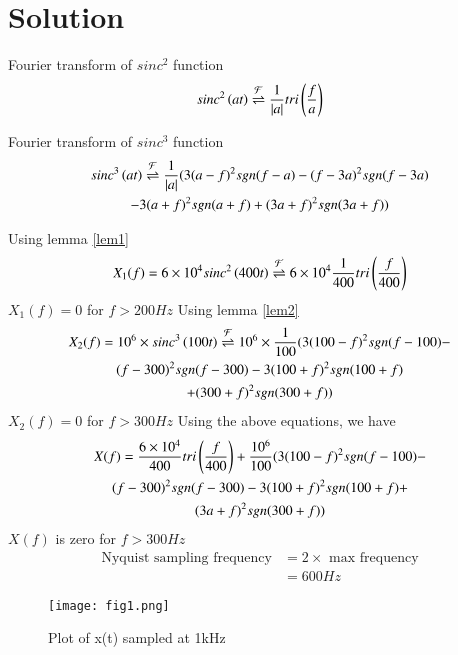 \documentclass[journal,12pt,twocolumn]{IEEEtran}
\begin{document}
\section{Solution}
\begin{lemma}
\label{lem1}
Fourier transform of $sinc^{2}$ function 
\begin{align}
     sinc^{2}\left(at\right) \overset{\mathcal{F}}{ \rightleftharpoons} \frac{1}{|a|}tri\left(\frac{f}{a}\right)\label{ft}
\end{align}
\end{lemma}
\begin{lemma}
\label{lem2}
Fourier transform of $sinc^{3}$ function 
\begin{multline}
     sinc^{3}\left(at\right) \overset{\mathcal{F}}{ \rightleftharpoons} \frac{1}{|a|} (3(a-f)^{2}sgn(f-a)-(f-3a)^{2}sgn(f-3a)\\-3(a+f)^{2}sgn(a+f)+(3a+f)^{2}sgn(3a+f))
\end{multline}
\end{lemma}
Using lemma \ref{lem1} 
\begin{align}
     X_{1}(f)=6\times 10^{4}sinc^{2}\left(400t\right) \overset{\mathcal{F}}{ \rightleftharpoons} 6\times 10^{4}\frac{1}{400}tri\left(\frac{f}{400}\right)
\end{align}
$X_{1}(f)=0$ for $f>200Hz$
Using lemma \ref{lem2}
\begin{multline}
         X_{2}(f)=10^{6}\times sinc^{3}\left(100t\right) \overset{\mathcal{F}}{ \rightleftharpoons} 10^{6}\times\frac{1}{100} (3(100-f)^{2}sgn(f-100)-\\(f-300)^{2}sgn(f-300)-3(100+f)^{2}sgn(100+f)\\+(300+f)^{2}sgn(300+f))
\end{multline}
$X_{2}(f)=0$ for $f>300Hz$
Using the above equations, we have
\begin{multline}
    X(f) = \frac{6\times 10^{4}}{400}tri\left(\frac{f}{400}\right)+ \frac{10^{6}}{100}(3(100-f)^{2}sgn(f-100)-\\(f-300)^{2}sgn(f-300)-3(100+f)^{2}sgn(100+f)+\\(3a+f)^{2}sgn(300+f))
\end{multline}
$X(f)$ is zero for $f>300Hz$
\begin{align}
    \text{Nyquist sampling frequency}&=2\times \text{ max frequency}\\
                       &=600Hz
\end{align}

\begin{figure}[!h]
 \centering
 \texttt{[image: fig1.png]}
 \caption{Plot of x(t) sampled at 1kHz}
 \label{plot}
\end{figure}
\end{document}
